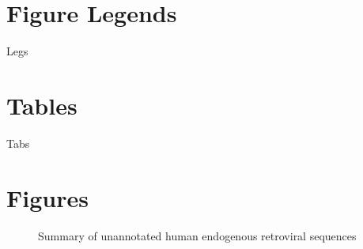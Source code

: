 \documentclass[11pt,letterpaper]{article}
\begin{document}
\section*{Figure Legends}

Legs

\section*{Tables}

Tabs

\section*{Figures}

\begin{figure}[ht]
  \caption{Summary of unannotated human endogenous retroviral sequences}
  \label{fig:ele_sum}
\end{figure}
\end{document}
